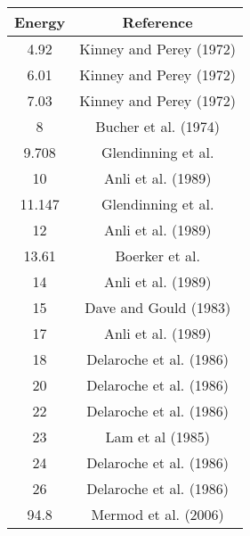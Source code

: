 \begin{tabular}{|c||c|} 
    \hline 
    \bf{Energy} & \bf{Reference} \\
    \hline
    \hline 
    4.92 & Kinney and Perey (1972) \cite{Kinney1972}\\
    6.01 & Kinney and Perey (1972) \cite{Kinney1972}\\
    7.03 & Kinney and Perey (1972) \cite{Kinney1972}\\
    8 & Bucher et al. (1974) \cite{Bucher1974}\\
    9.708 & Glendinning et al. \cite{Glendinning1982}\\
    10 & Anli et al. (1989) \cite{Anli1989}\\
    11.147 & Glendinning et al. \cite{Glendinning1982}\\
    12 & Anli et al. (1989) \cite{Anli1989}\\
    13.61 & Boerker et al. \cite{Boerker1988}\\
    14 & Anli et al. (1989) \cite{Anli1989}\\
    15 & Dave and Gould (1983) \cite{Dave1983}\\
    17 & Anli et al. (1989) \cite{Anli1989}\\
    18 & Delaroche et al. (1986) \cite{Delaroche1986}\\
    20 & Delaroche et al. (1986) \cite{Delaroche1986}\\
    22 & Delaroche et al. (1986) \cite{Delaroche1986}\\
    23 & Lam et al (1985) \cite{Lam1985}\\
    24 & Delaroche et al. (1986) \cite{Delaroche1986}\\
    26 & Delaroche et al. (1986) \cite{Delaroche1986}\\
    94.8 & Mermod et al. (2006) \cite{Mermod2006}\\
    \hline
\end{tabular}

